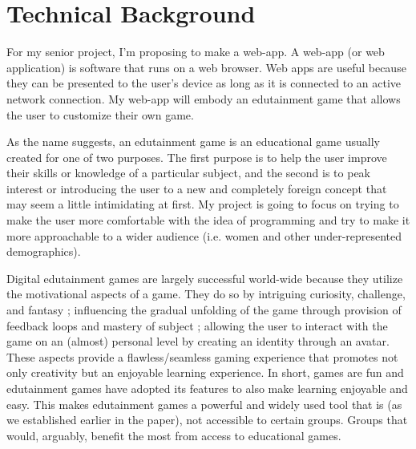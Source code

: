 \documentclass[10pt,twocolumn]{article}
\begin{document}
\section{Technical Background}

For my senior project, I’m proposing to make a web-app. A web-app (or web application) is software that runs on a web browser. Web apps are useful because they can be presented to the user's device as long as it is connected to an active network connection. My web-app will embody
an edutainment game that allows the user to customize their own game. 

As the name suggests, an edutainment game is an educational game usually created for one of two purposes. The first purpose is to help the user improve their skills or knowledge of a particular subject, and the second is to peak interest or introducing the user to a new and completely foreign concept that may seem a little intimidating at first. My project is going to focus on trying to make the user more comfortable with the idea of programming and try to make it more approachable to a wider audience (i.e. women and other under-represented demographics).

Digital edutainment games are largely successful world-wide because they utilize the motivational aspects of a game. They do so by intriguing curiosity, challenge, and fantasy \cite{malone1981makes}; influencing the gradual unfolding of the game through provision of feedback loops and mastery of subject \cite{qin2009measuring}; allowing the user to interact with the game on an (almost) personal level by creating an identity through an avatar. \cite{blascovich2011infinite} These aspects provide a flawless/seamless gaming experience that promotes not only creativity but an enjoyable learning experience. In short, games are fun and edutainment games have adopted its features to also make learning enjoyable and easy. This makes edutainment games a powerful and widely used tool that is (as we established earlier in the paper), not accessible to certain groups. Groups that would, arguably, benefit the most from access to educational games.
\end{document}
